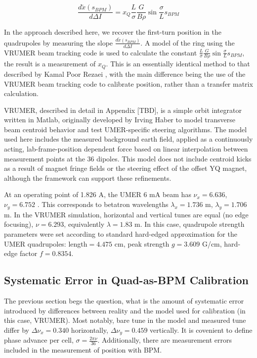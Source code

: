 \begin{equation} \frac{d \tilde{x}(s_{BPM})}{d\Delta I} = x_Q \frac{L}{\sigma} \frac{G}{B\rho} \sin{\frac{\sigma}{L}s_{BPM}} \label{eq:quad-response} \end{equation}

In the approach described here, we recover the first-turn position in the quadrupoles by measuring the slope $\frac{d \tilde{x}(s_{BPM})}{d\Delta I}$. A model of the ring using the VRUMER beam tracking code is used to calculate the constant $\frac{L}{\sigma} \frac{G}{B\rho} \sin{\frac{\sigma}{L}s_{BPM}}$, the result is a measurement of $x_Q$.
This is an essentially identical method to that described by Kamal Poor Rezaei \cite{KPRnote:2012}, 
with the main difference being the use of the VRUMER beam tracking code to calibrate position, rather than a transfer matrix calculation.  

VRUMER, described in detail in Appendix [TBD], is a simple orbit integrator written in Matlab, originally developed by Irving Haber to model transverse beam centroid behavior and test UMER-specific steering algorithms.
The model used here includes the measured background earth field, applied as a continuously acting, lab-frame-position dependent force based on linear interpolation between measurement points at the 36 dipoles.
This model does not include centroid kicks as a result of magnet fringe fields or the steering effect of the offset YQ magnet, although the framework can support these refinements.

At an operating point of 1.826 A, the UMER 6 mA beam has $\nu_x = 6.636$, $\nu_y=6.752$ \cite{RKnote:2010}. This corresponds to betatron wavelengths $\lambda_x = 1.736$ m, $\lambda_y=1.706$ m.
In the VRUMER simulation, horizontal and vertical tunes are equal (no edge focusing), $\nu=6.293$, equivalently $\lambda = 1.83$ m.
In this case, quadrupole strength parameters were set according to standard hard-edged approximation for the UMER quadrupoles: length$=4.475$ cm, peak strength $g=3.609$ G/cm, hard-edge factor $f=0.8354$.


\subsection{Systematic Error in Quad-as-BPM Calibration} \label{sec:steering:errors}

The previous section begs the question, what is the amount of systematic error introduced by differences between reality and the model used for calibration (in this case, VRUMER). Most notably, bare tune in the model and measured tune differ by $\Delta \nu_x = 0.340$ horizontally, $\Delta \nu_y = 0.459$ vertically. It is covenient to define phase advance per cell, $\sigma = \frac{2\pi\nu}{36}$. Additionally, there are measurement errors included in the measurement of position with BPM.

